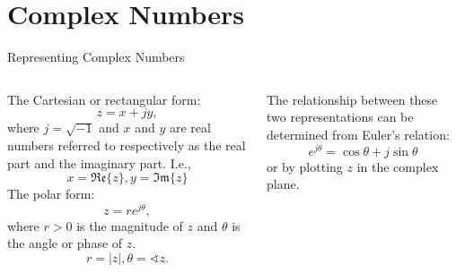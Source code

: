 \section{Complex Numbers}

\begin{frame}{Representing Complex Numbers}
    \begin{columns}[T]
        \begin{column}{0.5\textwidth}
            The \alert{Cartesian} or \alert{rectangular} form:
            \begin{equation*}
                z = x + jy,
            \end{equation*}
            where $j = \sqrt{-1}$ and $x$ and $y$ are real numbers referred to respectively as the real part and the imaginary part. I.e.,
            \begin{equation*}
                x = \mathfrak{Re}\{z\}, y = \mathfrak{Im}\{z\}
            \end{equation*}
            The \alert{polar} form:
            \begin{equation*}
                z = re^{j\theta},
            \end{equation*}
            where $r>0$ is the \alert{magnitude} of $z$ and $\theta$ is the \alert{angle} or \alert{phase} of $z$.
            \begin{equation*}
                r = |z|, \theta = \sphericalangle z.
            \end{equation*}
        \end{column}
        \pause
        \begin{column}{0.5\textwidth}
            \noindent The relationship between these two representations can be determined from \alert{Euler's relation}:
            \begin{equation*}
                e^{j\theta} = \cos\theta + j\sin\theta
            \end{equation*}
            or by plotting $z$ in the complex plane.
        \end{column}
    \end{columns}
\end{frame}


